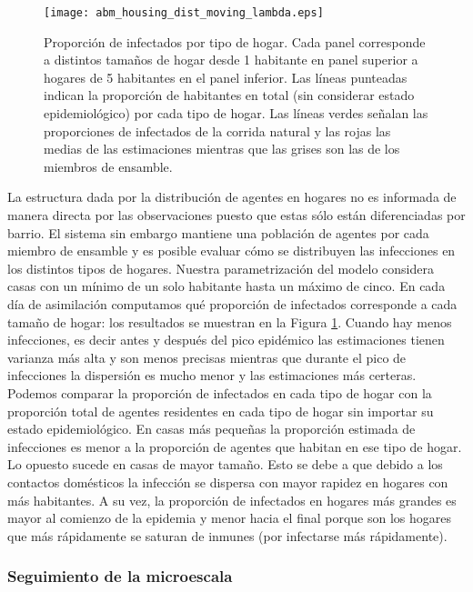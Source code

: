 \begin{figure}[h]
    \centering
    \texttt{[image: abm\_housing\_dist\_moving\_lambda.eps]}
    \caption{Proporción de infectados por tipo de hogar. Cada panel corresponde a distintos tamaños de hogar desde 1 habitante en panel superior a hogares de 5 habitantes en el panel inferior. Las líneas punteadas indican la proporción de habitantes en total (sin considerar estado epidemiológico) por cada tipo de hogar. Las líneas verdes señalan las proporciones de infectados de la corrida natural y las rojas las medias de las estimaciones mientras que las grises son las de los miembros de ensamble.}
    \label{fig:abm_housing_dist_moving_lambda}
\end{figure}

La estructura dada por la distribución de agentes en hogares no es informada de manera directa por las observaciones puesto que estas sólo están diferenciadas por barrio. El sistema sin embargo mantiene una población de agentes por cada miembro de ensamble y es posible evaluar cómo se distribuyen las infecciones en los distintos tipos de hogares. Nuestra parametrización del modelo considera casas con un mínimo de un solo habitante hasta un máximo de cinco. En cada día de asimilación computamos qué proporción de infectados corresponde a cada tamaño de hogar: los resultados se muestran en la Figura \ref{fig:abm_housing_dist_moving_lambda}. Cuando hay menos infecciones, es decir antes y después del pico epidémico las estimaciones tienen varianza más alta y son menos precisas mientras que durante el pico de infecciones la dispersión es mucho menor y las estimaciones más certeras. Podemos comparar la proporción de infectados en cada tipo de hogar con la proporción total de agentes residentes en cada tipo de hogar sin importar su estado epidemiológico. En casas más pequeñas la proporción estimada de infecciones es menor a la proporción de agentes que habitan en ese tipo de hogar. Lo opuesto sucede en casas de mayor tamaño. Esto se debe a que debido a los contactos domésticos la infección se dispersa con mayor rapidez en hogares con más habitantes. A su vez, la proporción de infectados en hogares más grandes es mayor al comienzo de la epidemia y menor hacia el final porque son los hogares que más rápidamente se saturan de inmunes (por infectarse más rápidamente).

\subsubsection{Seguimiento de la microescala}

